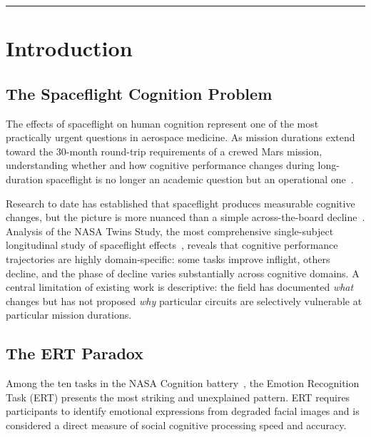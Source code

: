 \documentclass[11pt]{article}
\begin{document}
\vspace{0.5em}

\vspace{0.5em}
\noindent\rule{\linewidth}{0.5pt}
\vspace{1em}

\section{Introduction}

\subsection{The Spaceflight Cognition Problem}

The effects of spaceflight on human cognition represent one of the most
practically urgent questions in aerospace medicine.
As mission durations extend toward the 30-month round-trip requirements
of a crewed Mars mission, understanding whether and how cognitive performance
changes during long-duration spaceflight is no longer an academic question
but an operational one~\cite{basner2015,strangman2014}.

Research to date has established that spaceflight produces measurable
cognitive changes, but the picture is more nuanced than a simple
across-the-board decline~\cite{garrett2019,basner2015}.
Analysis of the NASA Twins Study, the most comprehensive single-subject
longitudinal study of spaceflight effects~\cite{garrett2019}, reveals
that cognitive performance trajectories are highly domain-specific: some
tasks improve inflight, others decline, and the phase of decline varies
substantially across cognitive domains.
A central limitation of existing work is descriptive: the field has
documented \emph{what} changes but has not proposed \emph{why} particular
circuits are selectively vulnerable at particular mission durations.

\subsection{The ERT Paradox}

Among the ten tasks in the NASA Cognition battery~\cite{basner2015}, the
Emotion Recognition Task (ERT) presents the most striking and unexplained
pattern.
ERT requires participants to identify emotional expressions from degraded
facial images and is considered a direct measure of social cognitive
processing speed and accuracy.
\end{document}
